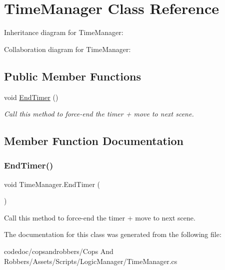 \hypertarget{classTimeManager}{}\section{Time\+Manager Class Reference}
\label{classTimeManager}


Inheritance diagram for Time\+Manager\+:


Collaboration diagram for Time\+Manager\+:
\subsection*{Public Member Functions}
\begin{DoxyCompactItemize}
\item 
void \hyperlink{classTimeManager_a717ae87a7edccee7c50e51a10ed65829}{End\+Timer} ()
\begin{DoxyCompactList}\small\item\em Call this method to force-\/end the timer + move to next scene. \end{DoxyCompactList}\end{DoxyCompactItemize}


\subsection{Member Function Documentation}
\mbox{\label{classTimeManager_a717ae87a7edccee7c50e51a10ed65829}} 
\subsubsection{\texorpdfstring{End\+Timer()}{EndTimer()}}
{\footnotesize\ttfamily void Time\+Manager.\+End\+Timer (\begin{DoxyParamCaption}{ }\end{DoxyParamCaption})\hspace{0.3cm}{\ttfamily [inline]}}



Call this method to force-\/end the timer + move to next scene. 



The documentation for this class was generated from the following file\+:\begin{DoxyCompactItemize}
\item 
codedoc/copsandrobbers/\+Cops And Robbers/\+Assets/\+Scripts/\+Logic\+Manager/Time\+Manager.\+cs\end{DoxyCompactItemize}
